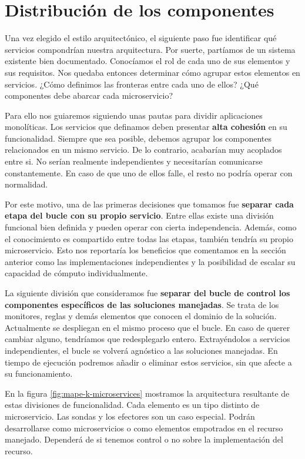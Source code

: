 \section{Distribución de los componentes}

Una vez elegido el estilo arquitectónico, el siguiente paso fue identificar qué servicios compondrían nuestra arquitectura. Por suerte, partíamos de un sistema existente bien documentado. Conocíamos el rol de cada uno de sus elementos y sus requisitos. Nos quedaba entonces determinar cómo agrupar estos elementos en servicios. ¿Cómo definimos las fronteras entre cada uno de ellos? ¿Qué componentes debe abarcar cada microservicio?

Para ello nos guiaremos siguiendo unas pautas para dividir aplicaciones monolíticas. \cite{newmanBuildingMicroservicesDesigning2021} Los servicios que definamos deben presentar \textbf{alta cohesión} en su funcionalidad. Siempre que sea posible, debemos agrupar los componentes relacionados en un mismo servicio. De lo contrario, acabarían muy acoplados entre si. No serían realmente independientes y necesitarían comunicarse constantemente. En caso de que uno de ellos falle, el resto no podría operar con normalidad.

Por este motivo, una de las primeras decisiones que tomamos fue \textbf{separar cada etapa del bucle con su propio servicio}. Entre ellas existe una división funcional bien definida y pueden operar con cierta independencia. Además, como el conocimiento es compartido entre todas las etapas, también tendría su propio microservicio. Esto nos reportaría los beneficios que comentamos en la sección anterior como las implementaciones independientes y la posibilidad de escalar su capacidad de cómputo individualmente.

La siguiente división que consideramos fue \textbf{separar del bucle de control los componentes específicos de las soluciones manejadas}. Se trata de los monitores, reglas y demás elementos que conocen el dominio de la solución. Actualmente se despliegan en el mismo proceso que el bucle. En caso de querer cambiar alguno, tendríamos que redesplegarlo entero. Extrayéndolos a servicios independientes, el bucle se volverá agnóstico a las soluciones manejadas. En tiempo de ejecución podremos añadir o eliminar estos servicios, sin que afecte a su funcionamiento.

En la figura \ref{fig:mape-k-microservices} mostramos la arquitectura resultante de estas divisiones de funcionalidad. Cada elemento es un tipo distinto de microservicio. Las sondas y los efectores son un caso especial. Podrán desarrollarse como microservicios o como elementos empotrados en el recurso manejado. Dependerá de si tenemos control o no sobre la implementación del recurso.

